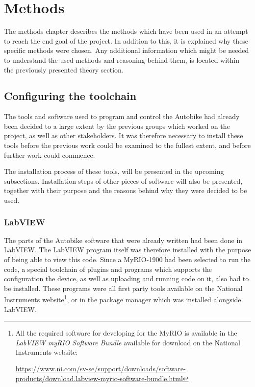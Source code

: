 \chapter{Methods}

The methods chapter describes the methods which have been used in an attempt to reach the end goal of the project. In addition to this, it is explained why these specific methods were chosen. Any additional information which might be needed to understand the used methods and reasoning behind them, is located within the previously presented theory section.

\section{Configuring the toolchain}

The tools and software used to program and control the Autobike had already been decided to a large extent by the previous groups which worked on the project, as well as other stakeholders. It was therefore necessary to install these tools before the previous work could be examined to the fullest extent, and before further work could commence.

The installation process of these tools, will be presented in the upcoming subsections. Installation steps of other pieces of software will also be presented, together with their purpose and the reasons behind why they were decided to be used.

\subsection{LabVIEW}

The parts of the Autobike software that were already written had been done in LabVIEW. The LabVIEW program itself was therefore installed with the purpose of being able to view this code. Since a MyRIO-1900 had been selected to run the code, a special toolchain of plugins and programs which supports the configuration the device, as well as uploading and running code on it, also had to be installed. These programs were all first party tools available on the National Instruments website\footnote{All the required software for developing for the MyRIO is available in the \textit{LabVIEW myRIO Software Bundle} available for download on the National Instruments website: \raggedright\url{https://www.ni.com/sv-se/support/downloads/software-products/download.labview-myrio-software-bundle.html}}, or in the package manager which was installed alongside LabVIEW. 

